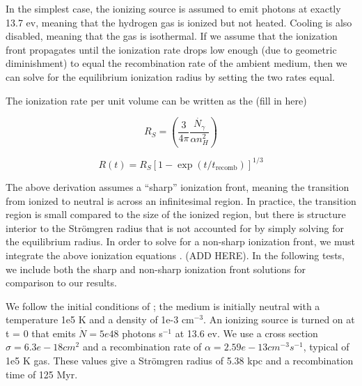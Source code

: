 In the simplest case, the ionizing source is assumed to emit photons at exactly 13.7 ev, meaning that the hydrogen gas is ionized but not heated. Cooling is also disabled, meaning that the gas is isothermal. If we assume that the ionization front propagates until the ionization rate drops low enough (due to geometric diminishment) to equal the recombination rate of the ambient medium, then we can solve for the equilibrium ionization radius by setting the two rates equal.

The ionization rate per unit volume can be written as the (fill in here)

%

\begin{equation}
\label{eq:strmogrenradius}
R_S = \left( \frac{3}{4\pi} \frac{\dot{N_{\gamma}}}{\alpha n_H^2}\right)
\end{equation}

\begin{equation}
\label{eq:stromgrentime}
R(t) = R_S[1-\exp{(t/t_{\mbox{recomb}})}]^{1/3}
\end{equation}

The above derivation assumes a ``sharp'' ionization front, meaning the transition from ionized to neutral is across an infinitesimal region. In practice, the transition region is small compared to the size of the ionized region, but there is structure interior to the Str\"omgren radius that is not accounted for by simply solving for the equilibrium radius. In order to solve for a non-sharp ionization front, we must integrate the above ionization equations \citep{osterbrockFerland2006}. (ADD HERE). In the following tests, we include both the sharp and non-sharp ionization front solutions for comparison to our results.

We follow the initial conditions of \citet{ilievEt2006}; the medium is initially neutral with a temperature 1e5 K and a density of 1e-3 cm$^{-3}$. An ionizing source is turned on at t = 0 that emits $\dot{N} = 5e48$ photons s$^{-1}$ at 13.6 ev. We use a cross section $\sigma = 6.3e-18 cm^2$ and a recombination rate of $\alpha = 2.59e-13 cm^{-3} s^{-1}$, typical of 1e5 K gas. These values give a Str\"omgren radius of 5.38 kpc and a recombination time of 125 Myr.

